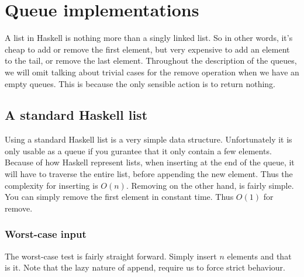 \section*{Queue implementations}
A list in Haskell is nothing more than a singly linked list. So in other words, it's cheap to add or remove the first element, but very expensive to add an element to the tail, or remove the last element. Throughout the description of the queues, we will omit talking about trivial cases for the remove operation when we have an empty queues. This is because the only sensible action is to return nothing.

\subsection*{A standard Haskell list}
Using a standard Haskell list is a very simple data structure. Unfortunately it is only usable as a queue if you gurantee that it only contain a few elements. Because of how Haskell represent lists, when inserting at the end of the queue, it will have to traverse the entire list, before appending the new element. Thus the complexity for inserting is $O(n)$. Removing on the other hand, is fairly simple. You can simply remove the first element in constant time. Thus $O(1)$ for remove.

\subsubsection{Worst-case input}
The worst-case test is fairly straight forward. Simply insert $n$ elements and that is it. Note that the lazy nature of append, require us to force strict behaviour.

